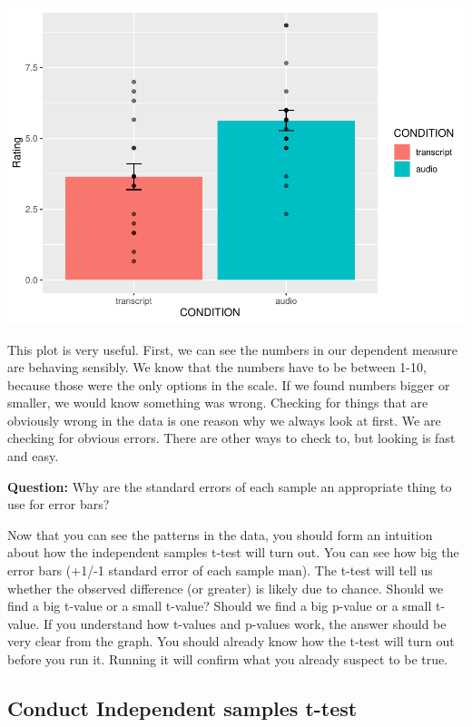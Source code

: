 \documentclass[]{book}
\begin{document}
\includegraphics{Statistics_Lab_files/figure-latex/unnamed-chunk-210-1.pdf}

This plot is very useful. First, we can see the numbers in our dependent
measure are behaving sensibly. We know that the numbers have to be
between 1-10, because those were the only options in the scale. If we
found numbers bigger or smaller, we would know something was wrong.
Checking for things that are obviously wrong in the data is one reason
why we always look at first. We are checking for obvious errors. There
are other ways to check to, but looking is fast and easy.

\textbf{Question:} Why are the standard errors of each sample an
appropriate thing to use for error bars?

Now that you can see the patterns in the data, you should form an
intuition about how the independent samples t-test will turn out. You
can see how big the error bars (+1/-1 standard error of each sample
man). The t-test will tell us whether the observed difference (or
greater) is likely due to chance. Should we find a big t-value or a
small t-value? Should we find a big p-value or a small t-value. If you
understand how t-values and p-values work, the answer should be very
clear from the graph. You should already know how the t-test will turn
out before you run it. Running it will confirm what you already suspect
to be true.

\subsection{Conduct Independent samples
t-test}\label{conduct-independent-samples-t-test}
\end{document}
